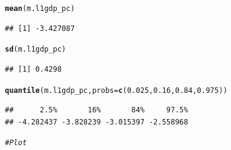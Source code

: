 \documentclass[12pt]{article}\usepackage[]{graphicx}\usepackage[]{color}
\makeatletter
\newcommand{\hlnum}[1]{\textcolor[rgb]{0.686,0.059,0.569}{#1}}%
\newcommand{\hlcom}[1]{\textcolor[rgb]{0.678,0.584,0.686}{\textit{#1}}}%
\newcommand{\hlstd}[1]{\textcolor[rgb]{0.345,0.345,0.345}{#1}}%
\newcommand{\hlkwc}[1]{\textcolor[rgb]{0.333,0.667,0.333}{#1}}%
\newcommand{\hlkwd}[1]{\textcolor[rgb]{0.737,0.353,0.396}{\textbf{#1}}}%
\newenvironment{kframe}{%
 \def\at@end@of@kframe{}%
 \ifinner\ifhmode%
  \def\at@end@of@kframe{\end{minipage}}%
  \begin{minipage}{\columnwidth}%
 \fi\fi%
 \def\FrameCommand##1{\hskip\@totalleftmargin \hskip-\fboxsep
 \colorbox{shadecolor}{##1}\hskip-\fboxsep
     \hskip-\linewidth \hskip-\@totalleftmargin \hskip\columnwidth}%
 \MakeFramed {\advance\hsize-\width
   \@totalleftmargin\z@ \linewidth\hsize
   \@setminipage}}%
 {\par\unskip\endMakeFramed%
 \at@end@of@kframe}
\newenvironment{knitrout}{}{} %
\makeatother
\begin{document}
\begin{knitrout}
\begin{kframe}
\begin{alltt}
\hlkwd{mean}\hlstd{(m.l1gdp_pc)}
\end{alltt}
\begin{verbatim}
## [1] -3.427087
\end{verbatim}
\begin{alltt}
\hlkwd{sd}\hlstd{(m.l1gdp_pc)}
\end{alltt}
\begin{verbatim}
## [1] 0.4298
\end{verbatim}
\begin{alltt}
\hlkwd{quantile}\hlstd{(m.l1gdp_pc,} \hlkwc{probs} \hlstd{=} \hlkwd{c}\hlstd{(}\hlnum{0.025}\hlstd{,} \hlnum{0.16}\hlstd{,} \hlnum{0.84}\hlstd{,} \hlnum{0.975}\hlstd{))}
\end{alltt}
\begin{verbatim}
##      2.5%       16%       84%     97.5% 
## -4.282437 -3.828239 -3.015397 -2.558968
\end{verbatim}
\begin{alltt}
\hlcom{# Plot}


\end{alltt}
\end{kframe}
\end{knitrout}
\end{document}

